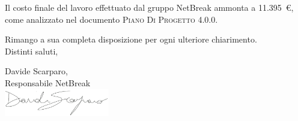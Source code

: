 \documentclass[11pt,a4paper]{letter}
\begin{document}
\begin{letter}
	Il costo finale del lavoro effettuato dal gruppo NetBreak ammonta a \hbox{11.395 \euro{}}, come analizzato nel documento \textsc{Piano Di Progetto 4.0.0}.

\noindent Rimango a sua completa disposizione per ogni ulteriore chiarimento.\\
Distinti saluti,
	

\closing{Davide Scarparo,\\ Responsabile NetBreak\\ \includegraphics[width=1.8in]{DS.png}}


\end{letter}
\end{document}
